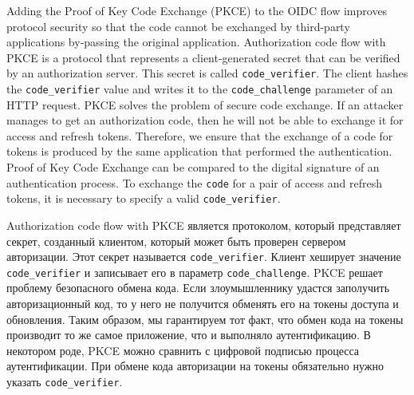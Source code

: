Adding the Proof of Key Code Exchange (PKCE) to the OIDC flow improves protocol security so that the code
cannot be exchanged by third-party applications by-passing the original application.
Authorization code flow with PKCE is a protocol that represents a client-generated secret that can be verified
by an authorization server.
This secret is called \texttt{code\_verifier}.
The client hashes the \texttt{code\_verifier} value and writes it to the \texttt{code\_challenge} parameter
of an HTTP request.
PKCE solves the problem of secure code exchange.
If an attacker manages to get an authorization code, then he will not be able to exchange
it for access and refresh tokens.
Therefore, we ensure that the exchange of a code for tokens is produced by the same application
that performed the authentication.
Proof of Key Code Exchange can be compared to the digital signature of an authentication process.
To exchange the \texttt{code} for a pair of access and refresh tokens, it is necessary to specify
a valid \texttt{code\_verifier}.

Authorization code flow with PKCE является протоколом, который представляет секрет, созданный клиентом,
который может быть проверен сервером авторизации.
Этот секрет называется \texttt{code\_verifier}.
Клиент хеширует значение \texttt{code\_verifier} и записывает его в параметр \texttt{code\_challenge}.
PKCE решает проблему безопасного обмена кода.
Если злоумышленнику удастся заполучить авторизационный код, то у него не получится обменять
его на токены доступа и обновления.
Таким образом, мы гарантируем тот факт, что обмен кода на токены производит то же самое приложение, что и выполняло аутентификацию.
В некотором роде, PKCE можно сравнить с цифровой подписью процесса аутентификации.
При обмене кода авторизации на токены обязательно нужно указать \texttt{code\_verifier}.